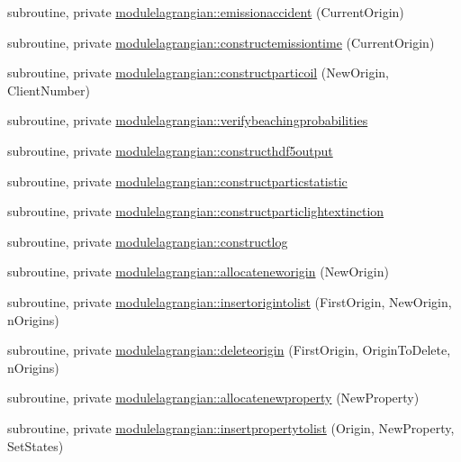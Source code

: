 \begin{DoxyCompactItemize}
subroutine, private \mbox{\hyperlink{namespacemodulelagrangian_a979d39b0267ea25c8a2db002477e9ffd}{modulelagrangian\+::emissionaccident}} (Current\+Origin)
\item 
subroutine, private \mbox{\hyperlink{namespacemodulelagrangian_aeeff0dc876b075a641427da62012e39e}{modulelagrangian\+::constructemissiontime}} (Current\+Origin)
\item 
subroutine, private \mbox{\hyperlink{namespacemodulelagrangian_a4ded42964190b91fb51481ee647db44a}{modulelagrangian\+::constructparticoil}} (New\+Origin, Client\+Number)
\item 
subroutine, private \mbox{\hyperlink{namespacemodulelagrangian_a73aa2ae55efd7276fcb02ec56c40eba3}{modulelagrangian\+::verifybeachingprobabilities}}
\item 
subroutine, private \mbox{\hyperlink{namespacemodulelagrangian_a95739a2a3f7752220aa5fe865d07c62b}{modulelagrangian\+::constructhdf5output}}
\item 
subroutine, private \mbox{\hyperlink{namespacemodulelagrangian_a9111f92be66d257fc573bf898bbc38d9}{modulelagrangian\+::constructparticstatistic}}
\item 
subroutine, private \mbox{\hyperlink{namespacemodulelagrangian_a30983416b73c9972c63df2c25371661d}{modulelagrangian\+::constructparticlightextinction}}
\item 
subroutine, private \mbox{\hyperlink{namespacemodulelagrangian_a6dace26d0d9efdc26334c8afd5ae9220}{modulelagrangian\+::constructlog}}
\item 
subroutine, private \mbox{\hyperlink{namespacemodulelagrangian_a28216eb4bc7ae29253535daa2e07a0ae}{modulelagrangian\+::allocateneworigin}} (New\+Origin)
\item 
subroutine, private \mbox{\hyperlink{namespacemodulelagrangian_a842c38bc1af98cfe321b3cd2eca5aa14}{modulelagrangian\+::insertorigintolist}} (First\+Origin, New\+Origin, n\+Origins)
\item 
subroutine, private \mbox{\hyperlink{namespacemodulelagrangian_a29d4dbfc02fe16a5c49ac6fac8d3e427}{modulelagrangian\+::deleteorigin}} (First\+Origin, Origin\+To\+Delete, n\+Origins)
\item 
subroutine, private \mbox{\hyperlink{namespacemodulelagrangian_a85933ed7a699fa0b842b3a0c17c94bbb}{modulelagrangian\+::allocatenewproperty}} (New\+Property)
\item 
subroutine, private \mbox{\hyperlink{namespacemodulelagrangian_ad3e2ea0ce974a102fea039aef69c4626}{modulelagrangian\+::insertpropertytolist}} (Origin, New\+Property, Set\+States)

\end{DoxyCompactItemize}
